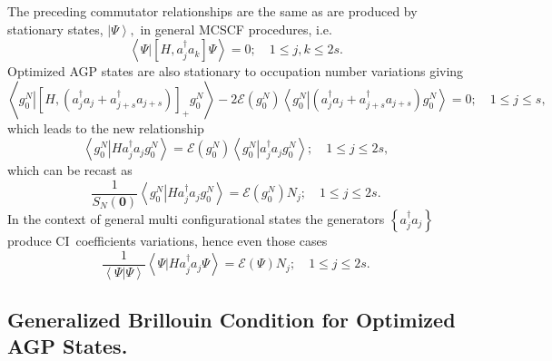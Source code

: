 \documentclass[aps,preprint]{revtex4}%
\begin{document}
The preceding commutator relationships are the same as are produced by
stationary states, $\left\vert \Psi\right\rangle ,$ in general MCSCF
procedures, i.e.
\begin{equation}
\left\langle \left.  \Psi\right\vert \left[  H,a_{j}^{\dagger}a_{k}\right]
\Psi\right\rangle =0;\quad1\leq j,k\leq2s.
\end{equation}
Optimized AGP states are also stationary to occupation number variations
giving
\begin{equation}
\left\langle \left.  g_{0}^{N}\right\vert \left[  H,\left(  a_{j}^{\dagger
}a_{j}+a_{j+s}^{\dagger}a_{j+s}\right)  \right]  _{+}g_{0}^{N}\right\rangle
-2\mathcal{E}\left(  g_{0}^{N}\right)  \left\langle \left.  g_{0}%
^{N}\right\vert \left(  a_{j}^{\dagger}a_{j}+a_{j+s}^{\dagger}a_{j+s}\right)
g_{0}^{N}\right\rangle =0;\quad1\leq j\leq s,
\end{equation}
which leads to the new relationship
\begin{equation}
\left\langle \left.  g_{0}^{N}\right\vert Ha_{j}^{\dagger}a_{j}g_{0}%
^{N}\right\rangle =\mathcal{E}\left(  g_{0}^{N}\right)  \left\langle \left.
g_{0}^{N}\right\vert a_{j}^{\dagger}a_{j}g_{0}^{N}\right\rangle ;\quad1\leq
j\leq2s,
\end{equation}
which can be recast as
\begin{equation}
\frac{1}{S_{N}\left(  \mathbf{0}\right)  }\left\langle \left.  g_{0}%
^{N}\right\vert Ha_{j}^{\dagger}a_{j}g_{0}^{N}\right\rangle =\mathcal{E}%
\left(  g_{0}^{N}\right)  N_{j};\quad1\leq j\leq2s. \label{occnumstat}%
\end{equation}
In the context of general multi configurational states the generators
$\left\{  a_{j}^{\dagger}a_{j}\right\}  $ produce CI\ coefficients variations,
hence even those cases
\begin{equation}
\frac{1}{\left\langle \left.  \Psi\right\vert \Psi\right\rangle }\left\langle
\left.  \Psi\right\vert Ha_{j}^{\dagger}a_{j}\Psi\right\rangle =\mathcal{E}%
\left(  \Psi\right)  N_{j};\quad1\leq j\leq2s.
\end{equation}


\subsection{Generalized Brillouin Condition for Optimized AGP
States.\label{Brillouin}}
\end{document}
